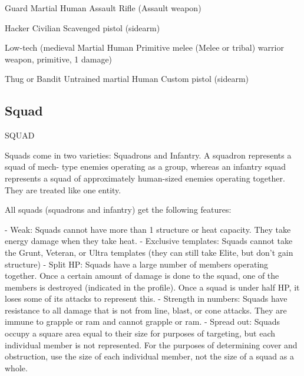  Guard                     Martial Human                        Assault Rifle (Assault  
                                                                weapon) 

 Hacker                    Civilian                             Scavenged pistol (sidearm) 

 Low-tech (medieval        Martial Human                        Primitive melee (Melee  
 or tribal) warrior                                             weapon, primitive, 1  
                                                                damage) 

 Thug or Bandit            Untrained martial Human              Custom pistol (sidearm) 

                                                                                                          
\subsection{Squad}

                                                 SQUAD   

Squads come in two varieties: Squadrons and Infantry. A squadron represents a squad of mech- 
type enemies operating as a group, whereas an infantry squad represents a squad of  
approximately human-sized enemies operating together. They are treated like one entity.
 

All squads (squadrons and infantry) get the following features:
 
    -   Weak: Squads cannot have more than 1 structure or heat capacity. They take energy  
        damage when they take heat.  
    -   Exclusive templates: Squads cannot take the Grunt, Veteran, or Ultra templates (they  
        can still take Elite, but don’t gain structure)  
    -   Split HP: Squads have a large number of members operating together. Once a certain  
        amount of damage is done to the squad, one of the members is destroyed (indicated in  
        the profile). Once a squad is under half HP, it loses some of its attacks to represent this.  
    -   Strength in numbers: Squads have resistance to all damage that is not from line, blast,  
        or cone attacks. They are immune to grapple or ram and cannot grapple or ram.  
    -   Spread out: Squads occupy a square area equal to their size for purposes of targeting,  
        but each individual member is not represented. For the purposes of determining cover  
        and obstruction, use the size of each individual member, not the size of a squad as a  
        whole.  

